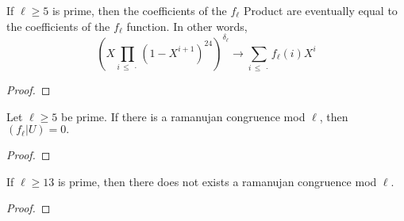 \begin{theorem}
  \label{thm:fl_Product_eventually_sum}
  \leanok
  If $\ell \ge 5$ is prime, then
  the coefficients of the $f_\ell$ Product are eventually equal to the coefficients of the $f_\ell$ function.
  In other words,
  \[ (X \prod_{i \, \le \: \cdot} (1 - X ^ {i + 1}) ^ {24}) ^ {\delta_\ell} \longrightarrow 
    \sum_{i \, \le \: \cdot} f_\ell (i) X ^ i \]
\end{theorem}
\begin{proof}
  \leanok
\end{proof}


\begin{theorem} 
  \label{thm:flu_eq_zero}
  \leanok
  Let $\ell \ge 5$ be prime. If there is a ramanujan congruence mod $\ell$,
  then $(f_\ell | U) = 0.$
\end{theorem}
\begin{proof}
  \leanok
\end{proof}

\begin{theorem}
  \label{thm:MainResult}
  \leanok
  If $\ell \ge 13$ is prime, then there does not exists a ramanujan congruence mod $\ell$.
\end{theorem}
\begin{proof}
  \leanok
\end{proof}


